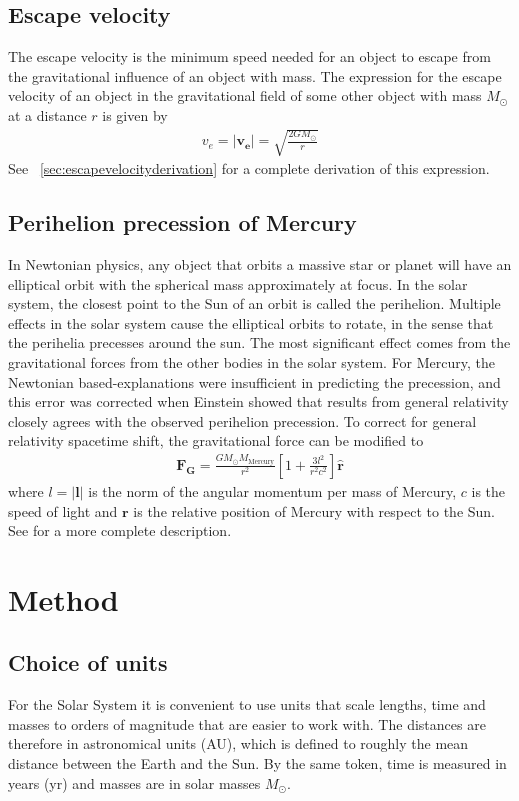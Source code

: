 \documentclass[aps,reprint]{revtex4-1}
\begin{document}
\subsection{Escape velocity}
The escape velocity is the minimum speed needed for an object to escape from the
gravitational influence of an object with mass. The expression for the escape
velocity of an object in the gravitational field of some other object with mass
$M_\odot$ at a distance $r$ is given by
\begin{align}
  \label{eq:escapevelocity}
  v_e = |\mathbf{v_e}| = \sqrt{\frac{2GM_\odot}{r}}
\end{align}
See ~\ref{sec:escapevelocityderivation} for a complete derivation of this expression.

\subsection{Perihelion precession of Mercury}
In Newtonian physics, any object that orbits a massive star or planet will have an elliptical orbit with
the spherical mass approximately at focus. In the solar system, the closest point to the Sun of an orbit is called
the perihelion. Multiple effects in the solar system cause the elliptical orbits to rotate, in the sense that the perihelia
precesses around the sun. The most significant effect comes from the gravitational forces from the other bodies in
the solar system. For Mercury, the Newtonian based-explanations were insufficient in predicting the precession, and
this error was corrected when Einstein showed that results from general relativity closely agrees with the observed
perihelion precession. To correct for general relativity spacetime shift, the gravitational force can be modified to
\begin{align}
\label{eq:mercuryprecession}
\mathbf{F_G} = \frac{G M_\odot M_\text{Mercury}}{r^2}\left[1 + \frac{3l^2}{r^2c^2} \right] \hat{\mathbf{r}}
\end{align}
where $l = |\mathbf{l}|$ is the norm of the angular momentum per mass of Mercury, $c$ is the speed of light and
$\mathbf{r}$ is the relative position of Mercury with respect to the Sun. See \cite{project3}
for a more complete description.
\section{Method}
\label{sec:method}
\subsection{Choice of units}
For the Solar System it is convenient to use units that scale lengths, time and
masses to orders of magnitude that are easier to work with. The distances are
therefore in astronomical units (AU), which is defined to roughly the mean
distance between the Earth and the Sun. By the same token, time is measured in
years (yr) and masses are in solar masses $M_\odot$.
\end{document}
